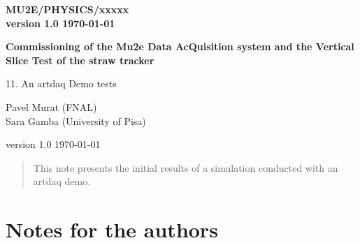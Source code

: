 \documentclass[12pt]{article}
\begin{document}
\begin{titlepage}
  \begin{flushright}
    \bf {MU2E/PHYSICS/xxxxx} \\
    version 1.0
    \today
 \end{flushright}

  \vspace{1cm}

  \begin{center}
    {\Large \bf Commissioning of the Mu2e Data AcQuisition system and the Vertical Slice Test of the straw tracker

      \vspace{0.3in}

      11. An artdaq Demo tests
    }

    \vspace{1cm}
    Pavel Murat (FNAL) \\
    Sara Gamba (University of Pisa)

   
    version 1.0
    \today
 \end{center}

  \begin{abstract}
    This note presents the initial results of a simulation conducted with an artdaq demo.
    \vspace{0.2in}
  \end{abstract}

\end{titlepage}
%
%
%
{\tableofcontents}
% 

\newpage

\section {Notes for the authors}
\end{document}
